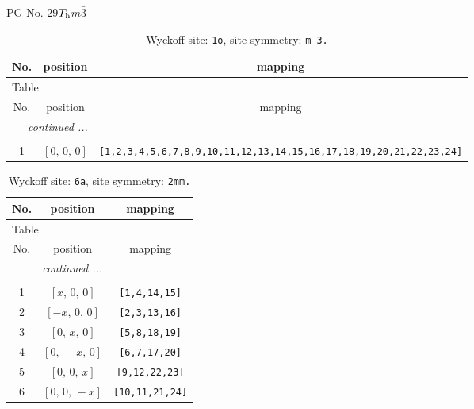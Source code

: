 \documentclass[fleqn,8pt]{jsarticle}
\begin{document}
\setcounter{MaxMatrixCols}{32}

\renewcommand{\tablename}{Table~}
\renewcommand{\figurename}{Figure~}
\begin{center}
\LARGE
PG No. 29\quad$T_{\rm h}$\quad$m\bar{3}$\quad[ cubic ]
\end{center}
\renewcommand{\arraystretch}{1.2}
\begin{longtable}{ccc}
\caption{Wyckoff site: {\tt 1o}, site symmetry: {\tt m-3.}}
 \\
 \hline \hline
No. & position & mapping \\ \hline \endfirsthead

\multicolumn{2}{l}{\tablename\ \thetable{}} \\
 \hline \hline
No. & position & mapping \\ \hline \endhead

 \hline \hline
\multicolumn{2}{r}{\footnotesize\it continued ...} \\ \endfoot

 \hline \hline
\multicolumn{2}{r}{} \\ \endlastfoot

1 & $\left[ 0,\, 0,\, 0 \right]$ & {\tt [1,2,3,4,5,6,7,8,9,10,11,12,13,14,15,16,17,18,19,20,21,22,23,24]} \\
\end{longtable}
\renewcommand{\arraystretch}{1.2}
\begin{longtable}{ccc}
\caption{Wyckoff site: {\tt 6a}, site symmetry: {\tt 2mm.}}
 \\
 \hline \hline
No. & position & mapping \\ \hline \endfirsthead

\multicolumn{2}{l}{\tablename\ \thetable{}} \\
 \hline \hline
No. & position & mapping \\ \hline \endhead

 \hline \hline
\multicolumn{2}{r}{\footnotesize\it continued ...} \\ \endfoot

 \hline \hline
\multicolumn{2}{r}{} \\ \endlastfoot

1 & $\left[ x,\, 0,\, 0 \right]$ & {\tt [1,4,14,15]} \\ \hline
2 & $\left[ - x,\, 0,\, 0 \right]$ & {\tt [2,3,13,16]} \\ \hline
3 & $\left[ 0,\, x,\, 0 \right]$ & {\tt [5,8,18,19]} \\ \hline
4 & $\left[ 0,\, - x,\, 0 \right]$ & {\tt [6,7,17,20]} \\ \hline
5 & $\left[ 0,\, 0,\, x \right]$ & {\tt [9,12,22,23]} \\ \hline
6 & $\left[ 0,\, 0,\, - x \right]$ & {\tt [10,11,21,24]} \\
\end{longtable}
\end{document}
